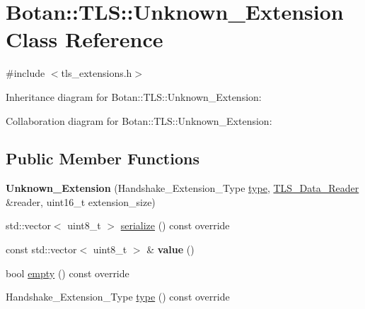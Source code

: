 \hypertarget{class_botan_1_1_t_l_s_1_1_unknown___extension}{}\section{Botan\+:\+:T\+LS\+:\+:Unknown\+\_\+\+Extension Class Reference}
\label{class_botan_1_1_t_l_s_1_1_unknown___extension}


{\ttfamily \#include $<$tls\+\_\+extensions.\+h$>$}



Inheritance diagram for Botan\+:\+:T\+LS\+:\+:Unknown\+\_\+\+Extension\+:


Collaboration diagram for Botan\+:\+:T\+LS\+:\+:Unknown\+\_\+\+Extension\+:
\subsection*{Public Member Functions}
\begin{DoxyCompactItemize}
\item 
\mbox{\label{class_botan_1_1_t_l_s_1_1_unknown___extension_a6a195a91a10e4198aaf4054a75629a44}} 
{\bfseries Unknown\+\_\+\+Extension} (Handshake\+\_\+\+Extension\+\_\+\+Type \mbox{\hyperlink{class_botan_1_1_t_l_s_1_1_unknown___extension_a3662bce2ca66c928000baba33369623d}{type}}, \mbox{\hyperlink{class_botan_1_1_t_l_s_1_1_t_l_s___data___reader}{T\+L\+S\+\_\+\+Data\+\_\+\+Reader}} \&reader, uint16\+\_\+t extension\+\_\+size)
\item 
std\+::vector$<$ uint8\+\_\+t $>$ \mbox{\hyperlink{class_botan_1_1_t_l_s_1_1_unknown___extension_aa0edf5df42996a8634ac7a0d35114e2f}{serialize}} () const override
\item 
\mbox{\label{class_botan_1_1_t_l_s_1_1_unknown___extension_afc7367cc5eea695277f9b6c6b95c1870}} 
const std\+::vector$<$ uint8\+\_\+t $>$ \& {\bfseries value} ()
\item 
bool \mbox{\hyperlink{class_botan_1_1_t_l_s_1_1_unknown___extension_a0b2f674ad0a239c57c20eda9caf60783}{empty}} () const override
\item 
Handshake\+\_\+\+Extension\+\_\+\+Type \mbox{\hyperlink{class_botan_1_1_t_l_s_1_1_unknown___extension_a3662bce2ca66c928000baba33369623d}{type}} () const override
\end{DoxyCompactItemize}


